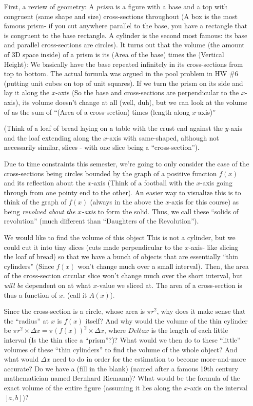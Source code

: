 \documentclass{ximera}
\begin{document}
First, a review of geometry:  A {\em prism} is a figure with a base and a top with congruent (same shape and size) cross-sections throughout (A box is the most famous prism- if you cut anywhere parallel to the base, you have a rectangle that is congruent to the base rectangle. A cylinder is the second most famous:  its base and parallel cross-sections are circles).  It turns out that the volume (the amount of $3$D space inside) of a prism is its (Area of the base) times the (Vertical Height):  We basically have the base repeated infinitely in its cross-sections from top to bottom.  The actual formula was argued in the pool problem in HW \#6 (putting unit cubes on top of unit squares).  If we turn the prism on its side and lay it along the $x$-axis (So the base and cross-sections are perpendicular to the $x$-axis), its volume doesn't change at all (well, duh), but we can look at the volume of as the sum of ``(Area of a cross-section) times (length along $x$-axis)''
      
(Think of a loaf of bread laying on a table with the crust end against the $y$-axis and the loaf extending along the $x$-axis with same-shaped, although not necessarily similar, slices - with one slice being a ``cross-section'').

Due to time constraints this semester, we're going to only consider the case of the cross-sections being circles bounded by the graph of a positive function $f(x)$ and its reflection about the $x$-axis (Think of a football with the $x$-axis going through from one pointy end to the other).  An easier way to visualize this is to think of the graph of $f(x)$ (always in the above the $x$-axis for this course) as being {\em revolved about the $x$-axis} to form the solid.  Thus, we call these ``solids of revolution'' (much different than ``Daughters of the Revolution'').  

We would like to find the volume of this object   This is not a cylinder, but we could cut it into tiny slices (cuts made perpendicular to the $x$-axis- like slicing the loaf of bread) so that we have a bunch of objects that are essentially ``thin cylinders'' (Since $f(x)$  won't change much over a small interval).  Then, the area of the cross-section circular slice won't change much over the short interval, but {\em will be} dependent on at what $x$-value we sliced at.  The area of a cross-section is thus a function of $x$. (call it $A(x)$).  

Since the cross-section is a circle, whose area is  $\pi r^2$, why does it make sense that the ``radius'' at $x$ is $f(x)$ itself?  And why would the volume of the thin cylinder be  $\pi r^2 \times \Delta x = \pi (f(x))^2 \times \Delta x$, where $Delta x$ is the length of each little interval (Is the thin slice a ``prism''?)?  What would we then do to these ``little'' volumes of these ``thin cylinders'' to find the volume of the whole object?  And what would $\Delta x$ need to do in order for the estimation to become more-and-more accurate?  Do we have a (fill in the blank) \underline{\hspace{0.5in}} (named after a famous 19th century mathematician named Bernhard Riemann)?  What would be the formula of the exact volume of the entire figure (assuming it lies along the $x$-axis on the interval $[a, b]$)?
\end{document}

